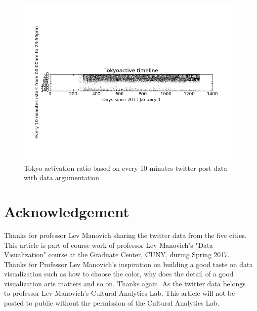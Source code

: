 \documentclass[a4paper,12pt]{article}
\begin{document}
 

 
   \begin{figure}[H]
  \begin{center}
      \includegraphics[scale=0.8]{Tokyobinary3.png}
\end{center}
\caption{Tokyo activation ratio based on every 10 minutes twitter post data  with data argumentation}
 \label {fig:2}
 \end{figure}
\section{Acknowledgement}

Thanks for professor Lev Manovich sharing the twitter data from the five cities. This article is part of course work of professor Lev Manovich's "Data Visualization" course at the Graduate Center, CUNY, during Spring 2017.  Thanks for Professor Lev Manovich's inspiration on building a good taste on data visualization such as how to choose the color, why does the detail of a good visualization arts matters and so on. Thanks again. As the twitter data belongs to professor Lev Manovich's Cultural Analytics Lab. This article will not be posted to public without the permission of the Cultural Analytics Lab.\\


 
  
 
\end{document}
